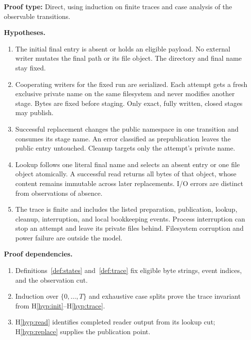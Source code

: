 \documentclass[12pt]{article}
\begin{document}
\noindent\textbf{Proof type:} Direct, using induction on finite traces
and case analysis of the observable transitions.

\noindent\textbf{Hypotheses.}
\begin{enumerate}[label=H\arabic*.,ref=\arabic*]
\item\label{hyp:init} The initial final entry is absent or holds an
eligible payload. No external writer mutates the final path or its
file object. The directory and final name stay fixed.
\item\label{hyp:private} Cooperating writers for the fixed run are
serialized. Each attempt gets a fresh exclusive private name on the
same filesystem and never modifies another stage. Bytes are fixed
before staging. Only exact, fully written, closed stages may publish.
\item\label{hyp:replace} Successful replacement changes the public
namespace in one transition and consumes its stage name. An error
classified as prepublication leaves the public entry untouched. Cleanup
targets only the attempt's private name.
\item\label{hyp:read} Lookup follows one literal final name and selects
an absent entry or one file object atomically. A successful read returns
all bytes of that object, whose content remains immutable across later
replacements. I/O errors are distinct from observations of absence.
\item\label{hyp:trace} The trace is finite and includes the listed
preparation, publication, lookup, cleanup, interruption, and local
bookkeeping events. Process interruption can stop an attempt and leave
its private files behind. Filesystem corruption and power failure are
outside the model.
\end{enumerate}

\noindent\textbf{Proof dependencies.}
\begin{enumerate}
\item Definitions~\ref{def:states} and~\ref{def:trace} fix
eligible byte strings, event indices, and the observation cut.
\item Induction over $\{0,\ldots,T\}$ and exhaustive case splits
prove the trace invariant from H\ref{hyp:init}--H\ref{hyp:trace}.
\item H\ref{hyp:read} identifies completed reader output from its
lookup cut; H\ref{hyp:replace} supplies the publication point.
\end{enumerate}
\end{document}
